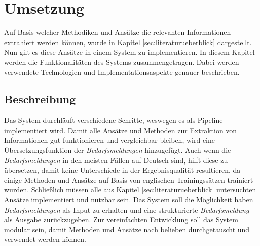 \chapter{Umsetzung}
\label{chap:implementierung}
Auf Basis welcher Methodiken und Ansätze die relevanten Informationen extrahiert werden können, wurde in Kapitel \ref{sec:literaturueberblick} dargestellt. Nun gilt es diese Ansätze in einem System zu implementieren. In diesem Kapitel werden die Funktionalitäten des Systems zusammengetragen. Dabei werden verwendete Technologien und Implementationsaspekte genauer beschrieben.
\section{Beschreibung}
Das System durchläuft verschiedene Schritte, weswegen es als Pipeline implementiert wird. Damit alle Ansätze und Methoden zur Extraktion von Informationen gut funktionieren und vergleichbar bleiben, wird eine Übersetzungsfunktion der \emph{Bedarfsmeldungen} hinzugefügt. Auch wenn die \emph{Bedarfsmeldungen} in den meisten Fällen auf Deutsch sind, hilft diese zu übersetzen, damit keine Unterschiede in der Ergebnisqualität resultieren, da einige Methoden und Ansätze auf Basis von englischen Trainingssätzen trainiert wurden. Schließlich müssen alle aus Kapitel \ref{sec:literaturueberblick} untersuchten Ansätze implementiert und nutzbar sein. Das System soll die Möglichkeit haben \emph{Bedarfsmeldungen} als Input zu erhalten und eine strukturierte \emph{Bedarfsmeldung} als Ausgabe zurückzugeben. Zur vereinfachten Entwicklung soll das System modular sein, damit Methoden und Ansätze nach belieben durchgetauscht und verwendet werden können.
